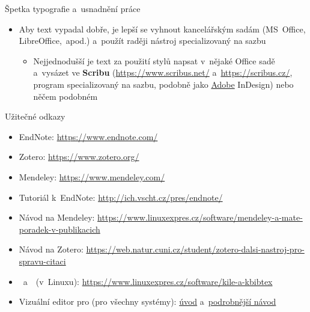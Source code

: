 \documentclass[compress, ucs, xelatex, 11pt, xcolor=svgnames, aspectratio=169,
	hyperref={
		bookmarks=true,
		unicode=true,
		colorlinks=true,
		pdftitle={Citacni software},
		plainpages=false,
		pdfauthor={Vojtech Zeisek},
		pdfsubject={Kratky uvod do citacniho software},
		pdfcreator={XeLaTeX},
		pdfkeywords={citace, reference, software, literatura},
		linkcolor=Crimson, %
		anchorcolor=Magenta, %
		citecolor=Magenta, %
		filecolor=Magenta, %
		menucolor=Magenta, %
		urlcolor=DarkTurquoise, %
		pdftex},
	url={hyphens, lowtilde} %
	]{beamer}
\begin{document}
\begin{frame}[allowframebreaks]{Špetka typografie a~usnadnění práce}
\begin{itemize}
		\item Aby text vypadal dobře, je lepší se vyhnout kancelářským sadám (MS~Office, LibreOffice,~apod.) a~použít raději nástroj specializovaný na sazbu
			\begin{itemize}
				\item Nejjednodušší je text za použití stylů napsat v~nějaké Office sadě a~vysázet ve \textbf{Scribu} (\url{https://www.scribus.net/} a~\url{https://scribus.cz/}, program specializovaný na sazbu, podobně jako \href{https://www.natur.cuni.cz/fakulta/cit/podpora-uzivatelu/softwarove-licence/adobe}{Adobe} InDesign) nebo něčem podobném
			\end{itemize}
	\end{itemize}
\end{frame}

\begin{frame}{Užitečné odkazy}
	\begin{itemize}
		\item EndNote: \url{https://www.endnote.com/}
		\item Zotero: \url{https://www.zotero.org/}
		\item Mendeley: \url{https://www.mendeley.com/}
		\item Tutoriál k~EndNote: \url{http://ich.vscht.cz/pres/endnote/}
		\item Návod na Mendeley: \url{https://www.linuxexpres.cz/software/mendeley-a-mate-poradek-v-publikacich}
		\item Návod na Zotero: \url{https://web.natur.cuni.cz/student/zotero-dalsi-nastroj-pro-spravu-citaci}
		\item \BibTeX~a~\XeLaTeX~(v~Linuxu): \url{https://www.linuxexpres.cz/software/kile-a-kbibtex}
		\item Vizuální editor pro \XeLaTeX (pro všechny systémy): \href{https://www.linuxexpres.cz/software/textovy-editor-lyx-latex-pro-line}{úvod} a~\href{https://www.linuxexpres.cz/praxe/diplomka-lyx}{podrobnější návod}
	\end{itemize}
\end{frame}
\end{document}
